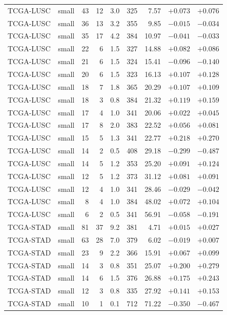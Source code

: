 \begin{longtable}{@{}llrrrrrrr@{}}
TCGA-LUSC & small & 43 & 12 & 3.0 & 325 & 7.57 & $+0.073$ & $+0.076$\\
TCGA-LUSC & small & 36 & 13 & 3.2 & 355 & 9.85 & $-0.015$ & $-0.034$\\
TCGA-LUSC & small & 35 & 17 & 4.2 & 384 & 10.97 & $-0.041$ & $-0.033$\\
TCGA-LUSC & small & 22 & 6 & 1.5 & 327 & 14.88 & $+0.082$ & $+0.086$\\
TCGA-LUSC & small & 21 & 6 & 1.5 & 324 & 15.41 & $-0.096$ & $-0.140$\\
TCGA-LUSC & small & 20 & 6 & 1.5 & 323 & 16.13 & $+0.107$ & $+0.128$\\
TCGA-LUSC & small & 18 & 7 & 1.8 & 365 & 20.29 & $+0.107$ & $+0.109$\\
TCGA-LUSC & small & 18 & 3 & 0.8 & 384 & 21.32 & $+0.119$ & $+0.159$\\
TCGA-LUSC & small & 17 & 4 & 1.0 & 341 & 20.06 & $+0.022$ & $+0.045$\\
TCGA-LUSC & small & 17 & 8 & 2.0 & 383 & 22.52 & $+0.056$ & $+0.081$\\
TCGA-LUSC & small & 15 & 5 & 1.3 & 341 & 22.77 & $+0.218$ & $+0.270$\\
TCGA-LUSC & small & 14 & 2 & 0.5 & 408 & 29.18 & $-0.299$ & $-0.487$\\
TCGA-LUSC & small & 14 & 5 & 1.2 & 353 & 25.20 & $+0.091$ & $+0.124$\\
TCGA-LUSC & small & 12 & 5 & 1.2 & 373 & 31.12 & $+0.081$ & $+0.091$\\
TCGA-LUSC & small & 12 & 4 & 1.0 & 341 & 28.46 & $-0.029$ & $-0.042$\\
TCGA-LUSC & small & 8 & 4 & 1.0 & 384 & 48.02 & $+0.072$ & $+0.104$\\
TCGA-LUSC & small & 6 & 2 & 0.5 & 341 & 56.91 & $-0.058$ & $-0.191$\\
TCGA-STAD & small & 81 & 37 & 9.2 & 381 & 4.71 & $+0.015$ & $+0.027$\\
TCGA-STAD & small & 63 & 28 & 7.0 & 379 & 6.02 & $-0.019$ & $+0.007$\\
TCGA-STAD & small & 23 & 9 & 2.2 & 366 & 15.91 & $+0.067$ & $+0.099$\\
TCGA-STAD & small & 14 & 3 & 0.8 & 351 & 25.07 & $+0.200$ & $+0.279$\\
TCGA-STAD & small & 14 & 6 & 1.5 & 376 & 26.88 & $+0.175$ & $+0.243$\\
TCGA-STAD & small & 12 & 3 & 0.8 & 335 & 27.92 & $+0.141$ & $+0.153$\\
TCGA-STAD & small & 10 & 1 & 0.1 & 712 & 71.22 & $-0.350$ & $-0.467$\\

\end{longtable}
